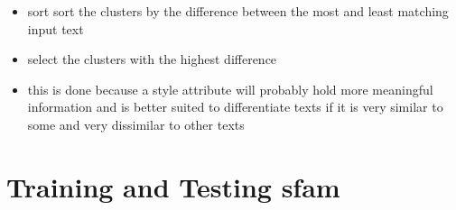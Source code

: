 \begin{itemize}
\begin{itemize}
          \item sort sort the clusters by the difference between the most and least matching input text
          \item select the clusters with the highest difference
          \item this is done because a style attribute will probably hold more meaningful information and is better suited to differentiate texts if it is very similar to some and very dissimilar to other texts
        \end{itemize}
\end{itemize}


\section{Training and Testing \acs{sfam}}
\label{sec:approach:sfam}

